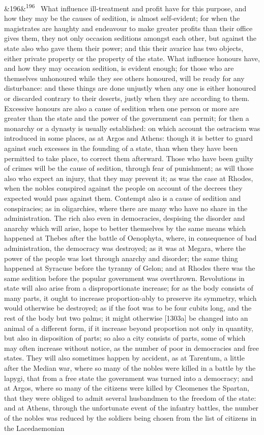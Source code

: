 \documentclass[12pt]{article}
\newcommand{\para}[1][]{\par\noindent\ifx&#1&\else\textsuperscript{\footnotesize #1}~\fi}
\begin{document}
\para[196] What influence ill-treatment and profit have for this purpose, and how they may be the causes of sedition, is almost self-evident; for when the magistrates are haughty and endeavour to make greater profits than their office gives them, they not only occasion seditions amongst each other, but against the state also who gave them their power; and this their avarice has two objects, either private property or the property of the state. What influence honours have, and how they may occasion sedition, is evident enough; for those who are themselves unhonoured while they see others honoured, will be ready for any disturbance: and these things are done unjustly when any one is either honoured or discarded contrary to their deserts, justly when they are according to them. Excessive honours are also a cause of sedition when one person or more are greater than the state and the power of the government can permit; for then a monarchy or a dynasty is usually established: on which account the ostracism was introduced in some places, as at Argos and Athens: though it is better to guard against such excesses in the founding of a state, than when they have been permitted to take place, to correct them afterward. Those who have been guilty of crimes will be the cause of sedition, through fear of punishment; as will those also who expect an injury, that they may prevent it; as was the case at Rhodes, when the nobles conspired against the people on account of the decrees they expected would pass against them. Contempt also is a cause of sedition and conspiracies; as in oligarchies, where there are many who have no share in the administration. The rich also even in democracies, despising the disorder and anarchy which will arise, hope to better themselves by the same means which happened at Thebes after the battle of Oenophyta, where, in consequence of bad administration, the democracy was destroyed; as it was at Megara, where the power of the people was lost through anarchy and disorder; the same thing happened at Syracuse before the tyranny of Gelon; and at Rhodes there was the same sedition before the popular government was overthrown. Revolutions in state will also arise from a disproportionate increase; for as the body consists of many parts, it ought to increase proportion-ably to preserve its symmetry, which would otherwise be destroyed; as if the foot was to be four cubits long, and the rest of the body but two palms; it might otherwise [1303a] be changed into an animal of a different form, if it increase beyond proportion not only in quantity, but also in disposition of parts; so also a city consists of parts, some of which may often increase without notice, as the number of poor in democracies and free states. They will also sometimes happen by accident, as at Tarentum, a little after the Median war, where so many of the nobles were killed in a battle by the lapygi, that from a free state the government was turned into a democracy; and at Argos, where so many of the citizens were killed by Cleomenes the Spartan, that they were obliged to admit several husbandmen to the freedom of the state: and at Athens, through the unfortunate event of the infantry battles, the number of the nobles was reduced by the soldiers being chosen from the list of citizens in the Lacedaemonian 
\end{document}
